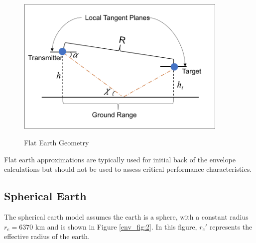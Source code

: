 \begin{figure}[H]
  \begin{center}
\includegraphics[width=4in]{../media/multistatic/flat_earth_geometry.png}
  \end{center}
  \renewcommand{\baselinestretch}{1} \small\normalsize
  \begin{quote}
    \caption[Flat Earth Geometry]{Flat Earth Geometry\label{env_fig:1}}
  \end{quote}
\end{figure}
\renewcommand{\baselinestretch}{2} \small\normalsize
Flat earth approximations are typically used for initial back of the envelope calculations but should not be used to assess critical performance characteristics. 

\subsection{Spherical Earth}
The spherical earth model assumes the earth is a sphere, with a constant radius $r_e = 6370$ km and is shown in Figure \ref{env_fig:2}. In this figure, $r_e'$ represents the effective radius of the earth.

